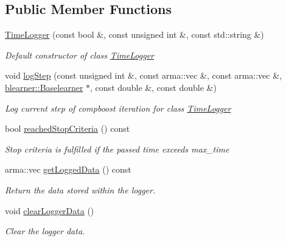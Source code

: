 \subsection*{Public Member Functions}
\begin{DoxyCompactItemize}
\item 
\mbox{\hyperlink{classlogger_1_1_time_logger_aa67d4d58b4894de7d158786961722751}{Time\+Logger}} (const bool \&, const unsigned int \&, const std\+::string \&)
\begin{DoxyCompactList}\small\item\em Default constructor of class {\ttfamily \mbox{\hyperlink{classlogger_1_1_time_logger}{Time\+Logger}}} \end{DoxyCompactList}\item 
void \mbox{\hyperlink{classlogger_1_1_time_logger_a9498311652805868b5a0ea7f5480f0be}{log\+Step}} (const unsigned int \&, const arma\+::vec \&, const arma\+::vec \&, \mbox{\hyperlink{classblearner_1_1_baselearner}{blearner\+::\+Baselearner}} $\ast$, const double \&, const double \&)
\begin{DoxyCompactList}\small\item\em Log current step of compboost iteration for class {\ttfamily \mbox{\hyperlink{classlogger_1_1_time_logger}{Time\+Logger}}} \end{DoxyCompactList}\item 
bool \mbox{\hyperlink{classlogger_1_1_time_logger_a380f7e56af17c8a35d729dad1a5e3baa}{reached\+Stop\+Criteria}} () const
\begin{DoxyCompactList}\small\item\em Stop criteria is fulfilled if the passed time exceeds {\ttfamily max\+\_\+time} \end{DoxyCompactList}\item 
arma\+::vec \mbox{\hyperlink{classlogger_1_1_time_logger_a1603279c79e69795133f1be9f3238d64}{get\+Logged\+Data}} () const
\begin{DoxyCompactList}\small\item\em Return the data stored within the logger. \end{DoxyCompactList}\item 
void \mbox{\hyperlink{classlogger_1_1_time_logger_aab07eb43e5e9ac80634a67baacd642b4}{clear\+Logger\+Data}} ()
\begin{DoxyCompactList}\small\item\em Clear the logger data. \end{DoxyCompactList}\item 

\end{DoxyCompactItemize}
